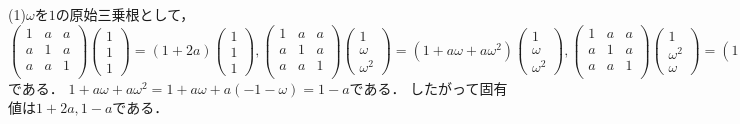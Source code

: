 \documentclass[
		book,
		head_space=20mm,
		foot_space=20mm,
		gutter=10mm,
		line_length=190mm
]{jlreq}
\begin{document}
(1)$\omega$を$1$の原始三乗根として，
$\begin{pmatrix}
1&a&a\\
a&1&a\\
a&a&1\\
\end{pmatrix}\begin{pmatrix}
1\\1\\1
\end{pmatrix}=(1+2a)\begin{pmatrix}
1\\1\\1
\end{pmatrix},\begin{pmatrix}
1&a&a\\
a&1&a\\
a&a&1\\
\end{pmatrix}\begin{pmatrix}
1\\\omega\\\omega^2
\end{pmatrix}=(1+a\omega+a\omega^2)\begin{pmatrix}
1\\\omega\\\omega^2
\end{pmatrix},\begin{pmatrix}
1&a&a\\
a&1&a\\
a&a&1\\
\end{pmatrix}\begin{pmatrix}
1\\\omega^2\\\omega
\end{pmatrix}=(1+a\omega+a\omega^2)\begin{pmatrix}
1\\\omega^2\\\omega
\end{pmatrix}$である．
$1+a\omega+a\omega^2=1+a\omega+a(-1-\omega)=1-a$である．
したがって固有値は$1+2a,1-a$である．
\end{document}
